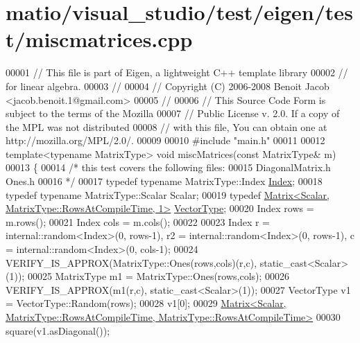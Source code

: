 \hypertarget{matio_2visual__studio_2test_2eigen_2test_2miscmatrices_8cpp_source}{}\section{matio/visual\+\_\+studio/test/eigen/test/miscmatrices.cpp}
\label{matio_2visual__studio_2test_2eigen_2test_2miscmatrices_8cpp_source}

\begin{DoxyCode}
00001 \textcolor{comment}{// This file is part of Eigen, a lightweight C++ template library}
00002 \textcolor{comment}{// for linear algebra.}
00003 \textcolor{comment}{//}
00004 \textcolor{comment}{// Copyright (C) 2006-2008 Benoit Jacob <jacob.benoit.1@gmail.com>}
00005 \textcolor{comment}{//}
00006 \textcolor{comment}{// This Source Code Form is subject to the terms of the Mozilla}
00007 \textcolor{comment}{// Public License v. 2.0. If a copy of the MPL was not distributed}
00008 \textcolor{comment}{// with this file, You can obtain one at http://mozilla.org/MPL/2.0/.}
00009 
00010 \textcolor{preprocessor}{#include "main.h"}
00011 
00012 \textcolor{keyword}{template}<\textcolor{keyword}{typename} MatrixType> \textcolor{keywordtype}{void} miscMatrices(\textcolor{keyword}{const} MatrixType& m)
00013 \{
00014   \textcolor{comment}{/* this test covers the following files:}
00015 \textcolor{comment}{     DiagonalMatrix.h Ones.h}
00016 \textcolor{comment}{  */}
00017   \textcolor{keyword}{typedef} \textcolor{keyword}{typename} MatrixType::Index \hyperlink{namespace_eigen_a62e77e0933482dafde8fe197d9a2cfde}{Index};
00018   \textcolor{keyword}{typedef} \textcolor{keyword}{typename} MatrixType::Scalar Scalar;
00019   \textcolor{keyword}{typedef} \hyperlink{group___core___module_class_eigen_1_1_matrix}{Matrix<Scalar, MatrixType::RowsAtCompileTime, 1>} 
      \hyperlink{struct_vector_type}{VectorType};
00020   Index rows = m.rows();
00021   Index cols = m.cols();
00022 
00023   Index r = internal::random<Index>(0, rows-1), r2 = internal::random<Index>(0, rows-1), c = 
      internal::random<Index>(0, cols-1);
00024   VERIFY\_IS\_APPROX(MatrixType::Ones(rows,cols)(r,c), static\_cast<Scalar>(1));
00025   MatrixType m1 = MatrixType::Ones(rows,cols);
00026   VERIFY\_IS\_APPROX(m1(r,c), static\_cast<Scalar>(1));
00027   VectorType v1 = VectorType::Random(rows);
00028   v1[0];
00029   \hyperlink{group___core___module_class_eigen_1_1_matrix}{Matrix<Scalar, MatrixType::RowsAtCompileTime, MatrixType::RowsAtCompileTime>}
00030   square(v1.asDiagonal());

\end{DoxyCode}
